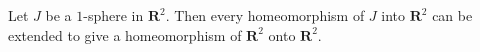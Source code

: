 Let $J$ be a $1$-sphere in $\mathbf{R}^2$. Then every homeomorphism of $J$ into $\mathbf{R}^2$ can be extended to give a homeomorphism of $\mathbf{R}^2$ onto $\mathbf{R}^2$.
